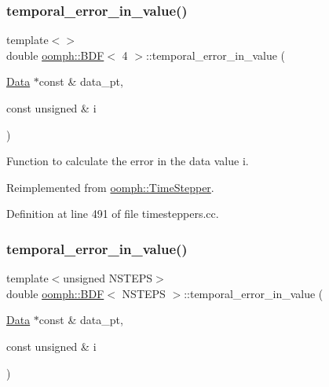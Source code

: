 \mbox{\label{classoomph_1_1BDF_ab15c8dbf5716b7cb7dde42550b848528}} 
\subsubsection{\texorpdfstring{temporal\+\_\+error\+\_\+in\+\_\+value()}{temporal\_error\_in\_value()}\hspace{0.1cm}{\footnotesize\ttfamily [3/4]}}
{\footnotesize\ttfamily template$<$$>$ \\
double \hyperlink{classoomph_1_1BDF}{oomph\+::\+B\+DF}$<$ 4 $>$\+::temporal\+\_\+error\+\_\+in\+\_\+value (\begin{DoxyParamCaption}\item[{\hyperlink{classoomph_1_1Data}{Data} $\ast$const \&}]{data\+\_\+pt,  }\item[{const unsigned \&}]{i }\end{DoxyParamCaption})\hspace{0.3cm}{\ttfamily [virtual]}}



Function to calculate the error in the data value i. 



Reimplemented from \hyperlink{classoomph_1_1TimeStepper_a27f66759f6d9b2040d26918adb998c78}{oomph\+::\+Time\+Stepper}.



Definition at line 491 of file timesteppers.\+cc.

\mbox{\label{classoomph_1_1BDF_aab34e35252db11052c72ae7692825149}} 
\subsubsection{\texorpdfstring{temporal\+\_\+error\+\_\+in\+\_\+value()}{temporal\_error\_in\_value()}\hspace{0.1cm}{\footnotesize\ttfamily [4/4]}}
{\footnotesize\ttfamily template$<$unsigned N\+S\+T\+E\+PS$>$ \\
double \hyperlink{classoomph_1_1BDF}{oomph\+::\+B\+DF}$<$ N\+S\+T\+E\+PS $>$\+::temporal\+\_\+error\+\_\+in\+\_\+value (\begin{DoxyParamCaption}\item[{\hyperlink{classoomph_1_1Data}{Data} $\ast$const \&}]{data\+\_\+pt,  }\item[{const unsigned \&}]{i }\end{DoxyParamCaption})\hspace{0.3cm}{\ttfamily [virtual]}}



